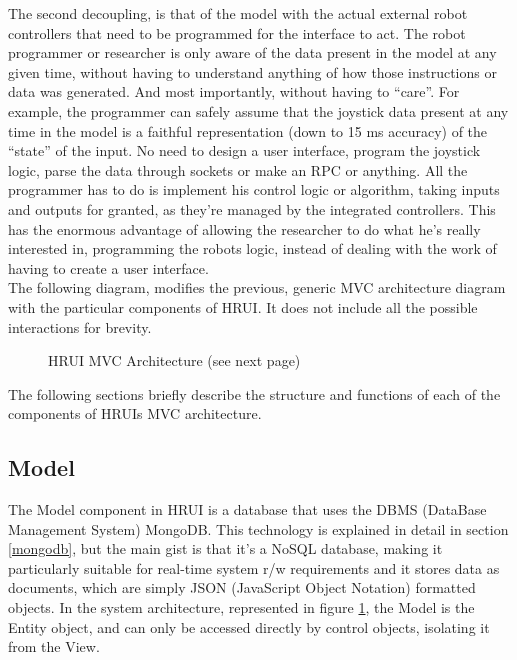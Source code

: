 The second decoupling, is that of the model with the actual external robot controllers that need to be programmed for the 
interface to act. The robot programmer or researcher is only aware of the data present in the model at any given time, 
without having to understand anything of how those instructions or data was generated. And most importantly, without having 
to ``care''. For example, the programmer can safely assume that the joystick data present at any time in the model is a 
faithful representation (down to 15 ms accuracy) of the ``state'' of the input. No need to design a user interface, program 
the joystick logic, parse the data through sockets or make an RPC or anything. All the programmer has to do is implement 
his control logic or algorithm, taking inputs and outputs for granted, as they're managed by the integrated controllers. 
This has the enormous advantage of allowing the researcher to do what he's really interested in, programming the robots 
logic, instead of dealing with the work of having to create a user interface.\\

The following diagram, modifies the previous, generic MVC architecture diagram with the particular components of HRUI. It 
does not include all the possible interactions for brevity.\\
\begin{figure}[H]
\caption{HRUI MVC Architecture (see next page)\label{mvcarch}}
\end{figure}

The following sections briefly describe the structure and functions of each of the components of HRUIs MVC architecture.
\subsection{Model}
The Model component in HRUI is a database that uses the DBMS (DataBase Management System) MongoDB. This technology is 
explained in detail in section \ref{mongodb}, but the main gist is that it's a NoSQL database, making it particularly 
suitable for real-time system r/w requirements and it stores data as documents, which are simply JSON (JavaScript Object 
Notation) formatted objects. In the system architecture, represented in figure \ref{mvcarch}, the Model is the Entity 
object, and can only be accessed directly by control objects, isolating it from the View.\\

